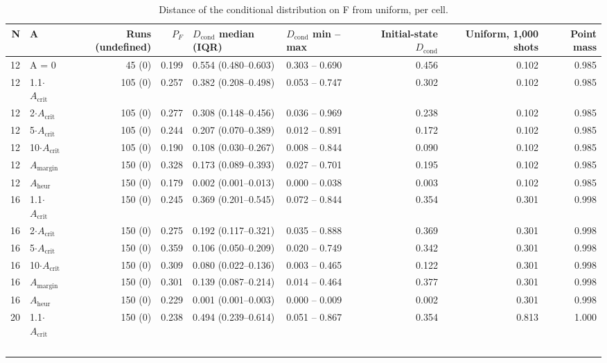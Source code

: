 \documentclass[journal]{IEEEtran}
\begin{document}
\begin{table}[!t]
\centering
\scriptsize
\caption{Distance of the conditional distribution on F from uniform, per cell.}
\label{tab:S18}
\begin{tabular}{rlrrllrrr}
\toprule
N & A & Runs (undefined) & $P_{F}$ & $D_{\mathrm{cond}}$ median (IQR) & $D_{\mathrm{cond}}$ min -- max & Initial-state $D_{\mathrm{cond}}$ & Uniform, 1,000 shots & Point mass \\
\midrule
12 & A = 0 & 45 (0) & 0.199 & 0.554 (0.480--0.603) & 0.303 -- 0.690 & 0.456 & 0.102 & 0.985 \\
12 & 1.1$\cdot$$A_{\mathrm{crit}}$ & 105 (0) & 0.257 & 0.382 (0.208--0.498) & 0.053 -- 0.747 & 0.302 & 0.102 & 0.985 \\
12 & 2$\cdot$$A_{\mathrm{crit}}$ & 105 (0) & 0.277 & 0.308 (0.148--0.456) & 0.036 -- 0.969 & 0.238 & 0.102 & 0.985 \\
12 & 5$\cdot$$A_{\mathrm{crit}}$ & 105 (0) & 0.244 & 0.207 (0.070--0.389) & 0.012 -- 0.891 & 0.172 & 0.102 & 0.985 \\
12 & 10$\cdot$$A_{\mathrm{crit}}$ & 105 (0) & 0.190 & 0.108 (0.030--0.267) & 0.008 -- 0.844 & 0.090 & 0.102 & 0.985 \\
12 & $A_{\mathrm{margin}}$ & 150 (0) & 0.328 & 0.173 (0.089--0.393) & 0.027 -- 0.701 & 0.195 & 0.102 & 0.985 \\
12 & $A_{\mathrm{heur}}$ & 150 (0) & 0.179 & 0.002 (0.001--0.013) & 0.000 -- 0.038 & 0.003 & 0.102 & 0.985 \\
16 & 1.1$\cdot$$A_{\mathrm{crit}}$ & 150 (0) & 0.245 & 0.369 (0.201--0.545) & 0.072 -- 0.844 & 0.354 & 0.301 & 0.998 \\
16 & 2$\cdot$$A_{\mathrm{crit}}$ & 150 (0) & 0.275 & 0.192 (0.117--0.321) & 0.035 -- 0.888 & 0.369 & 0.301 & 0.998 \\
16 & 5$\cdot$$A_{\mathrm{crit}}$ & 150 (0) & 0.359 & 0.106 (0.050--0.209) & 0.020 -- 0.749 & 0.342 & 0.301 & 0.998 \\
16 & 10$\cdot$$A_{\mathrm{crit}}$ & 150 (0) & 0.309 & 0.080 (0.022--0.136) & 0.003 -- 0.465 & 0.122 & 0.301 & 0.998 \\
16 & $A_{\mathrm{margin}}$ & 150 (0) & 0.301 & 0.139 (0.087--0.214) & 0.014 -- 0.464 & 0.377 & 0.301 & 0.998 \\
16 & $A_{\mathrm{heur}}$ & 150 (0) & 0.229 & 0.001 (0.001--0.003) & 0.000 -- 0.009 & 0.002 & 0.301 & 0.998 \\
20 & 1.1$\cdot$$A_{\mathrm{crit}}$ & 150 (0) & 0.238 & 0.494 (0.239--0.614) & 0.051 -- 0.867 & 0.354 & 0.813 & 1.000 \\
$$
\end{tabular}
\end{table}
\end{document}
